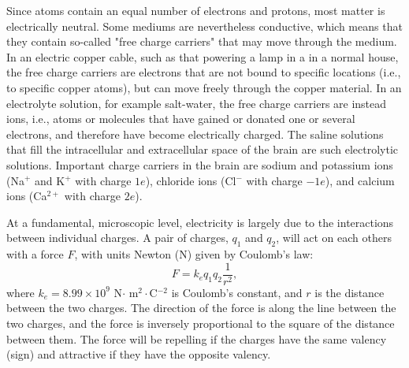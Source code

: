 Since atoms contain an equal number of electrons and protons, most matter is electrically neutral. Some mediums are nevertheless conductive, which means that they contain so-called "free charge carriers" that may move through the medium. In an electric copper cable, such as that powering a lamp in a in a normal house, the free charge carriers are electrons that are not bound to specific locations (i.e., to specific copper atoms), but can move freely through the copper material. In an electrolyte solution, for example salt-water, the free charge carriers are instead ions, i.e., atoms or molecules that have gained or donated one or several electrons, and therefore have become electrically charged. The saline solutions that fill the intracellular and extracellular space of the brain are such electrolytic solutions. Important charge carriers in the brain are sodium and potassium ions (Na$^+$ and K$^+$ with charge $1e$), chloride ions (Cl$^-$ with charge $-1e$), and calcium ions (Ca$^{2+}$ with charge $2e$).

At a fundamental, microscopic level, electricity is largely due to the interactions between individual charges. A pair of charges, $q_1$ and $q_2$, will act on each others with a force $F$, with units Newton (N) given by Coulomb's law:
\begin{equation}
F = k_e q_1q_2 \frac{1}{r^2}, 
\label{eq:Basics:CoulombF}
\end{equation}
where $k_e = 8.99\times10^9$ N$\cdot$ m$^2\cdot$C$^{-2}$ is Coulomb's constant, and $r$ is the distance between the two charges. The direction of the force is along the line between the two charges, and the force is inversely proportional to the square of the distance between them. The force will be repelling if the charges have the same valency (sign) and attractive if they have the opposite valency. 

